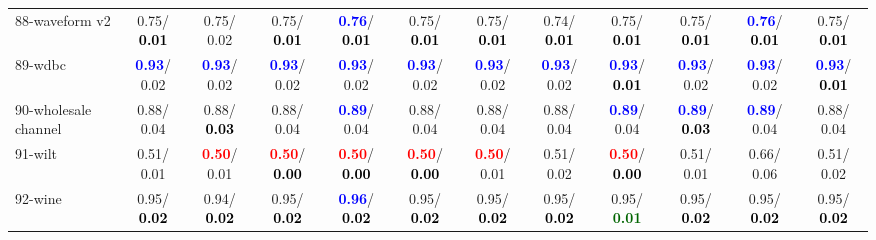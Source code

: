 \begin{table}[h]
\begin{center}
{\begin{tabular}{lc|c|c|c|c|c|c|c|c|c|c}
88-waveform v2 &   0.75/\textcolor{black}{\textbf{  0.01}} &   0.75/  0.02 &   0.75/\textcolor{black}{\textbf{  0.01}} & \textcolor{blue}{\textbf{  0.76}}/\textcolor{black}{\textbf{  0.01}} &   0.75/\textcolor{black}{\textbf{  0.01}} &   0.75/\textcolor{black}{\textbf{  0.01}} &   0.74/\textcolor{black}{\textbf{  0.01}} &   0.75/\textcolor{black}{\textbf{  0.01}} &   0.75/\textcolor{black}{\textbf{  0.01}} & \textcolor{blue}{\textbf{  0.76}}/\textcolor{black}{\textbf{  0.01}} &   0.75/\textcolor{black}{\textbf{  0.01}} \\
89-wdbc & \textcolor{blue}{\textbf{  0.93}}/  0.02 & \textcolor{blue}{\textbf{  0.93}}/  0.02 & \textcolor{blue}{\textbf{  0.93}}/  0.02 & \textcolor{blue}{\textbf{  0.93}}/  0.02 & \textcolor{blue}{\textbf{  0.93}}/  0.02 & \textcolor{blue}{\textbf{  0.93}}/  0.02 & \textcolor{blue}{\textbf{  0.93}}/  0.02 & \textcolor{blue}{\textbf{  0.93}}/\textcolor{black}{\textbf{  0.01}} & \textcolor{blue}{\textbf{  0.93}}/  0.02 & \textcolor{blue}{\textbf{  0.93}}/  0.02 & \textcolor{blue}{\textbf{  0.93}}/\textcolor{black}{\textbf{  0.01}} \\
90-wholesale channel &   0.88/  0.04 &   0.88/\textcolor{black}{\textbf{  0.03}} &   0.88/  0.04 & \textcolor{blue}{\textbf{  0.89}}/  0.04 &   0.88/  0.04 &   0.88/  0.04 &   0.88/  0.04 & \textcolor{blue}{\textbf{  0.89}}/  0.04 & \textcolor{blue}{\textbf{  0.89}}/\textcolor{black}{\textbf{  0.03}} & \textcolor{blue}{\textbf{  0.89}}/  0.04 &   0.88/  0.04 \\
91-wilt &   0.51/  0.01 & \textcolor{red}{\textbf{  0.50}}/  0.01 & \textcolor{red}{\textbf{  0.50}}/\textcolor{black}{\textbf{  0.00}} & \textcolor{red}{\textbf{  0.50}}/\textcolor{black}{\textbf{  0.00}} & \textcolor{red}{\textbf{  0.50}}/\textcolor{black}{\textbf{  0.00}} & \textcolor{red}{\textbf{  0.50}}/  0.01 &   0.51/  0.02 & \textcolor{red}{\textbf{  0.50}}/\textcolor{black}{\textbf{  0.00}} &   0.51/  0.01 &   0.66/  0.06 &   0.51/  0.02 \\
92-wine &   0.95/\textcolor{black}{\textbf{  0.02}} &   0.94/\textcolor{black}{\textbf{  0.02}} &   0.95/\textcolor{black}{\textbf{  0.02}} & \textcolor{blue}{\textbf{  0.96}}/\textcolor{black}{\textbf{  0.02}} &   0.95/\textcolor{black}{\textbf{  0.02}} &   0.95/\textcolor{black}{\textbf{  0.02}} &   0.95/\textcolor{black}{\textbf{  0.02}} &   0.95/\textcolor{darkgreen}{\textbf{  0.01}} &   0.95/\textcolor{black}{\textbf{  0.02}} &   0.95/\textcolor{black}{\textbf{  0.02}} &   0.95/\textcolor{black}{\textbf{  0.02}} \\ \hline

\end{tabular}}
\end{center}
\end{table}
